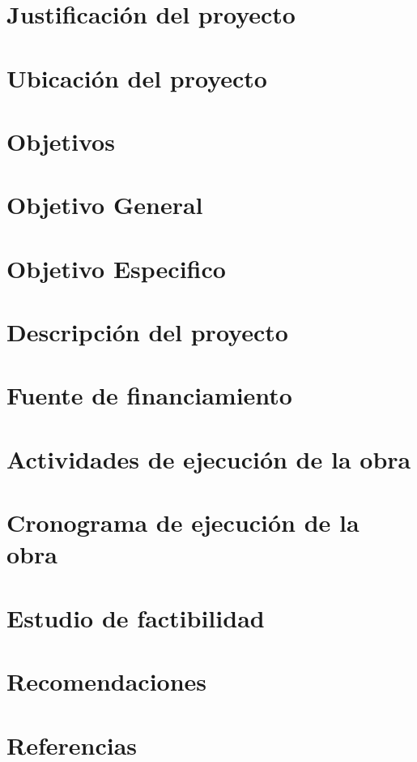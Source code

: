 \documentclass[conference]{IEEEtran}
\begin{document}
\section{Justificación del proyecto}
\section{Ubicación del proyecto}
\section{Objetivos}
\section{Objetivo General}
\section{Objetivo Especifico}

\section{Descripción del proyecto}
\section{Fuente de financiamiento}
\section{Actividades de ejecución de la obra}
\section{Cronograma de ejecución de la obra}
\section{Estudio de factibilidad}




\section{Recomendaciones}

\section{Referencias}


%
%
\end{document}
